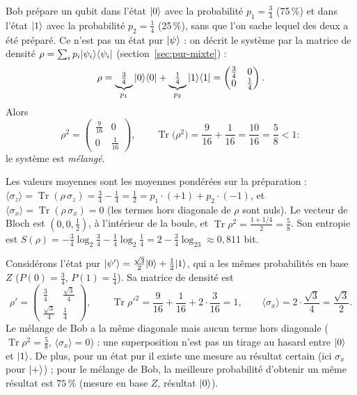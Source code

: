 Bob prépare un qubit dans l'état $|0\rangle$ avec la probabilité $p_1=\frac34$ (75\,\%) et dans
l'état $|1\rangle$ avec la probabilité $p_2=\frac14$ (25\,\%), sans que l'on sache lequel des deux a
été préparé. Ce n'est pas un état pur $|\psi\rangle$ : on décrit le système par la matrice de
densité $\rho=\sum_ip_i|\psi_i\rangle\langle \psi_i|$ (section~\ref{sec:pur-mixte}) :
\[
  \rho=\underbrace{\tfrac34}_{p_1}|0\rangle\langle 0|+\underbrace{\tfrac14}_{p_2}|1\rangle\langle 1|
  =\begin{pmatrix}\frac34&0\\0&\frac14\end{pmatrix}.
\]
Alors
\[
  \rho^2=\begin{pmatrix}\frac{9}{16}&0\\0&\frac{1}{16}\end{pmatrix},
  \qquad
  \operatorname{Tr}\big(\rho^2\big)=\frac{9}{16}+\frac{1}{16}=\frac{10}{16}=\frac58<1 :
\]
le système est \emph{mélangé}.

Les valeurs moyennes sont les moyennes pondérées sur la préparation :
$\langle\sigma_z\rangle=\operatorname{Tr}(\rho\,\sigma_z)=\frac34-\frac14=\frac12
=p_1\cdot(+1)+p_2\cdot(-1)$, et $\langle\sigma_x\rangle=\operatorname{Tr}(\rho\,\sigma_x)=0$
(les termes hors diagonale de $\rho$ sont nuls). Le vecteur de Bloch est $(0,0,\frac12)$,
à l'intérieur de la boule, et $\operatorname{Tr}\rho^2=\frac{1+1/4}{2}=\frac58$. Son entropie
est $S(\rho)=-\frac34\log_2\frac34-\frac14\log_2\frac14=2-\frac34\log_23\approx0{,}811$ bit.

\begin{remarque}
Considérons l'état pur $|\psi'\rangle=\frac{\sqrt3}{2}|0\rangle+\frac12|1\rangle$, qui a les mêmes
probabilités en base $Z$ ($P(0)=\frac34$, $P(1)=\frac14$). Sa matrice de densité est
\[
  \rho'=\begin{pmatrix}\frac34&\frac{\sqrt3}{4}\\[0.4ex]\frac{\sqrt3}{4}&\frac14\end{pmatrix},
  \qquad
  \operatorname{Tr}\rho'^2=\frac{9}{16}+\frac1{16}+2\cdot\frac{3}{16}=1,
  \qquad
  \langle\sigma_x\rangle=2\cdot\frac{\sqrt3}{4}=\frac{\sqrt3}{2}.
\]
Le mélange de Bob a la même diagonale mais aucun terme hors diagonale ($\operatorname{Tr}\rho^2=\frac58$,
$\langle\sigma_x\rangle=0$) : une superposition n'est pas un tirage au hasard entre $|0\rangle$ et
$|1\rangle$. De plus, pour un état pur il existe une mesure au résultat certain (ici $\sigma_x$ pour
$|+\rangle$) ; pour le mélange de Bob, la meilleure probabilité d'obtenir un même résultat est
$75\,\%$ (mesure en base $Z$, résultat $|0\rangle$).
\end{remarque}

